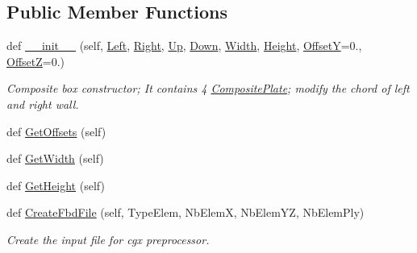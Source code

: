 \subsection*{Public Member Functions}
\begin{DoxyCompactItemize}
\item 
def \hyperlink{classgebtaero_1_1_composite_box_1_1_composite_box_a64c4292dbd036313813fc00a78fb13cb}{\+\_\+\+\_\+init\+\_\+\+\_\+} (self, \hyperlink{classgebtaero_1_1_composite_box_1_1_composite_box_a7bfe2dab84e5ae8d8cdba1337b89c309}{Left}, \hyperlink{classgebtaero_1_1_composite_box_1_1_composite_box_a61cdca93cc1f5ef451192395fc50b67b}{Right}, \hyperlink{classgebtaero_1_1_composite_box_1_1_composite_box_a4c043150a29d71b986a91f21be6a4e47}{Up}, \hyperlink{classgebtaero_1_1_composite_box_1_1_composite_box_ad1559917cabe3fcb6c05bf603d8b0b0c}{Down}, \hyperlink{classgebtaero_1_1_composite_box_1_1_composite_box_a44593d7302ceb1c46ac637437b5e1061}{Width}, \hyperlink{classgebtaero_1_1_composite_box_1_1_composite_box_affc2b38183c3b0ec7534629cf63e4cc5}{Height}, \hyperlink{classgebtaero_1_1_composite_box_1_1_composite_box_a26fcf7763030afb28f45f2354125c352}{OffsetY}=0., \hyperlink{classgebtaero_1_1_composite_box_1_1_composite_box_a50e38078e66133a95f34f2d9176329d9}{OffsetZ}=0.)
\begin{DoxyCompactList}\small\item\em Composite box constructor; It contains 4 \hyperlink{namespacegebtaero_1_1_composite_plate}{Composite\+Plate}; modify the chord of left and right wall. \end{DoxyCompactList}\item 
def \hyperlink{classgebtaero_1_1_composite_box_1_1_composite_box_a80477ea79acc12d0d45970d6c0b208d6}{Get\+Offsets} (self)
\item 
def \hyperlink{classgebtaero_1_1_composite_box_1_1_composite_box_a227089b18b5436fdba7853cbe1071a99}{Get\+Width} (self)
\item 
def \hyperlink{classgebtaero_1_1_composite_box_1_1_composite_box_a8ca332752a2b78ca0ba4c65f99ab1b62}{Get\+Height} (self)
\item 
def \hyperlink{classgebtaero_1_1_composite_box_1_1_composite_box_af2465d364bb51056af14fde13bd05d4a}{Create\+Fbd\+File} (self, Type\+Elem, Nb\+ElemX, Nb\+Elem\+YZ, Nb\+Elem\+Ply)
\begin{DoxyCompactList}\small\item\em Create the input file for cgx preprocessor. \end{DoxyCompactList}\item 

\end{DoxyCompactItemize}
